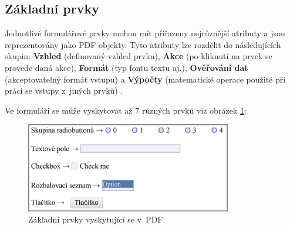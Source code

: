 \subsection{Základní prvky} \label{subsec:zakladni_prvky}
Jednotlivé formulářové prvky mohou mít přiřazeny nejrůznější atributy a jsou reprezentovány jako PDF objekty. Tyto atributy lze rozdělit do následujících skupin: \textbf{Vzhled} (definovaný vzhled prvku), \textbf{Akce} (po kliknutí na prvek se provede daná akce), \textbf{Formát} (typ fontu textu aj.), \textbf{Ověřování dat} (akceptovatelný formát vstupu) a \textbf{Výpočty} (matematické operace použité při práci se vstupy z~jiných prvků) \cite{PDFFormElements}. 
\par
Ve formuláři se může vyskytovat až 7 různých prvků viz obrázek \ref{fig:form_elements}:
	\begin{figure}[h!]
	\centering
	\includegraphics[width=9cm]{img/pdf_form_elements}
	\caption{Základní prvky vyskytující se v~PDF}
	\label{fig:form_elements}
	\end{figure}

